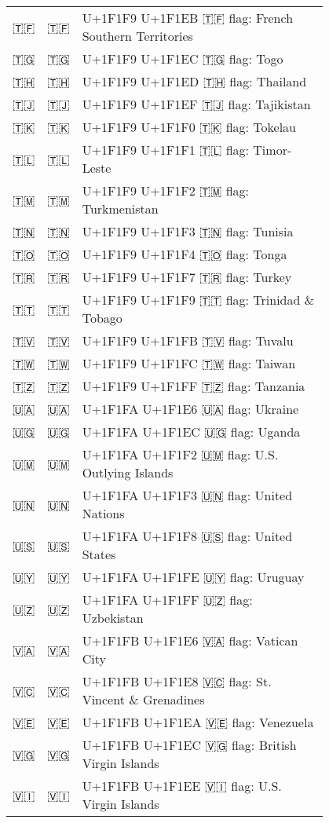 \documentclass[a4paper,12pt]{ltjarticle}
\newcommand{\fontA}[1]{{\fontspec[RawFeature={mode=harf,+dist,+ccmp}]{Segoe UI Emoji} #1}}
\newcommand{\fontB}[1]{{\fontspec[RawFeature={mode=harf,+dist,+ccmp}]{Noto Color Emoji} #1}}
\begin{document}
\begin{longtable}[c]{ccp{0.8\linewidth}}
\fontA{🇹🇫}&\fontB{🇹🇫}&U+1F1F9 U+1F1EB 🇹🇫 flag: French Southern Territories\\
\fontA{🇹🇬}&\fontB{🇹🇬}&U+1F1F9 U+1F1EC 🇹🇬 flag: Togo\\
\fontA{🇹🇭}&\fontB{🇹🇭}&U+1F1F9 U+1F1ED 🇹🇭 flag: Thailand\\
\fontA{🇹🇯}&\fontB{🇹🇯}&U+1F1F9 U+1F1EF 🇹🇯 flag: Tajikistan\\
\fontA{🇹🇰}&\fontB{🇹🇰}&U+1F1F9 U+1F1F0 🇹🇰 flag: Tokelau\\
\fontA{🇹🇱}&\fontB{🇹🇱}&U+1F1F9 U+1F1F1 🇹🇱 flag: Timor-Leste\\
\fontA{🇹🇲}&\fontB{🇹🇲}&U+1F1F9 U+1F1F2 🇹🇲 flag: Turkmenistan\\
\fontA{🇹🇳}&\fontB{🇹🇳}&U+1F1F9 U+1F1F3 🇹🇳 flag: Tunisia\\
\fontA{🇹🇴}&\fontB{🇹🇴}&U+1F1F9 U+1F1F4 🇹🇴 flag: Tonga\\
\fontA{🇹🇷}&\fontB{🇹🇷}&U+1F1F9 U+1F1F7 🇹🇷 flag: Turkey\\
\fontA{🇹🇹}&\fontB{🇹🇹}&U+1F1F9 U+1F1F9 🇹🇹 flag: Trinidad \& Tobago\\
\fontA{🇹🇻}&\fontB{🇹🇻}&U+1F1F9 U+1F1FB 🇹🇻 flag: Tuvalu\\
\fontA{🇹🇼}&\fontB{🇹🇼}&U+1F1F9 U+1F1FC 🇹🇼 flag: Taiwan\\
\fontA{🇹🇿}&\fontB{🇹🇿}&U+1F1F9 U+1F1FF 🇹🇿 flag: Tanzania\\
\fontA{🇺🇦}&\fontB{🇺🇦}&U+1F1FA U+1F1E6 🇺🇦 flag: Ukraine\\
\fontA{🇺🇬}&\fontB{🇺🇬}&U+1F1FA U+1F1EC 🇺🇬 flag: Uganda\\
\fontA{🇺🇲}&\fontB{🇺🇲}&U+1F1FA U+1F1F2 🇺🇲 flag: U.S. Outlying Islands\\
\fontA{🇺🇳}&\fontB{🇺🇳}&U+1F1FA U+1F1F3 🇺🇳 flag: United Nations\\
\fontA{🇺🇸}&\fontB{🇺🇸}&U+1F1FA U+1F1F8 🇺🇸 flag: United States\\
\fontA{🇺🇾}&\fontB{🇺🇾}&U+1F1FA U+1F1FE 🇺🇾 flag: Uruguay\\
\fontA{🇺🇿}&\fontB{🇺🇿}&U+1F1FA U+1F1FF 🇺🇿 flag: Uzbekistan\\
\fontA{🇻🇦}&\fontB{🇻🇦}&U+1F1FB U+1F1E6 🇻🇦 flag: Vatican City\\
\fontA{🇻🇨}&\fontB{🇻🇨}&U+1F1FB U+1F1E8 🇻🇨 flag: St. Vincent \& Grenadines\\
\fontA{🇻🇪}&\fontB{🇻🇪}&U+1F1FB U+1F1EA 🇻🇪 flag: Venezuela\\
\fontA{🇻🇬}&\fontB{🇻🇬}&U+1F1FB U+1F1EC 🇻🇬 flag: British Virgin Islands\\
\fontA{🇻🇮}&\fontB{🇻🇮}&U+1F1FB U+1F1EE 🇻🇮 flag: U.S. Virgin Islands\\

\end{longtable}
\end{document}
